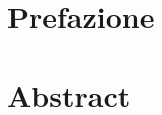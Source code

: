 \documentclass[14pt]{extreport}
\begin{document}
\onehalfspace
{}

\newpage
\chapter*{Prefazione}

\chapter*{Abstract}

\tableofcontents
\listoffigures %
\listoftables %










\printbibliography
\end{document}
